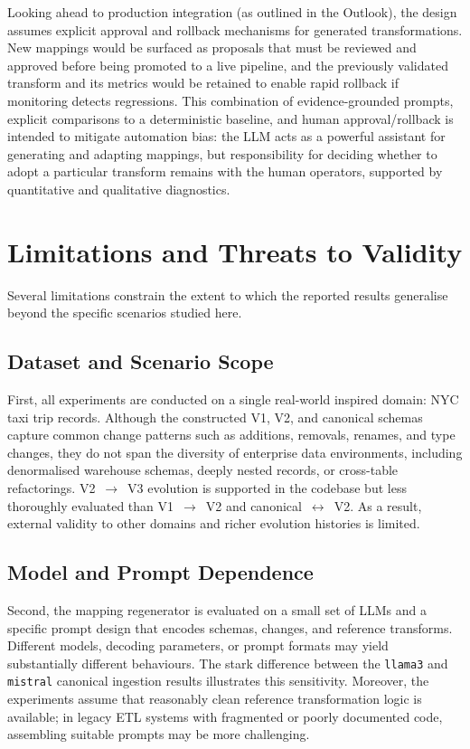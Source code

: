 Looking ahead to production integration (as outlined in the Outlook), the design assumes explicit
approval and rollback mechanisms for generated transformations. New mappings would be surfaced as
proposals that must be reviewed and approved before being promoted to a live pipeline, and the
previously validated transform and its metrics would be retained to enable rapid rollback if
monitoring detects regressions. This combination of evidence-grounded prompts, explicit
comparisons to a deterministic baseline, and human approval/rollback is intended to mitigate
automation bias: the LLM acts as a powerful assistant for generating and adapting mappings, but
responsibility for deciding whether to adopt a particular transform remains with the human
operators, supported by quantitative and qualitative diagnostics.


\section{Limitations and Threats to Validity}
\label{sec:discussion-limitations}

Several limitations constrain the extent to which the reported results generalise beyond the specific scenarios studied here.

\subsection{Dataset and Scenario Scope}

First, all experiments are conducted on a single real-world inspired domain: NYC taxi trip records. Although the constructed V1, V2, and canonical schemas capture common change patterns such as additions, removals, renames, and type changes, they do not span the diversity of enterprise data environments, including denormalised warehouse schemas, deeply nested records, or cross-table refactorings. V2~$\rightarrow$~V3 evolution is supported in the codebase but less thoroughly evaluated than V1~$\rightarrow$~V2 and canonical~$\leftrightarrow$~V2. As a result, external validity to other domains and richer evolution histories is limited.

\subsection{Model and Prompt Dependence}

Second, the mapping regenerator is evaluated on a small set of LLMs and a specific prompt design that encodes schemas, changes, and reference transforms. Different models, decoding parameters, or prompt formats may yield substantially different behaviours. The stark difference between the \texttt{llama3} and \texttt{mistral} canonical ingestion results illustrates this sensitivity. Moreover, the experiments assume that reasonably clean reference transformation logic is available; in legacy ETL systems with fragmented or poorly documented code, assembling suitable prompts may be more challenging.

